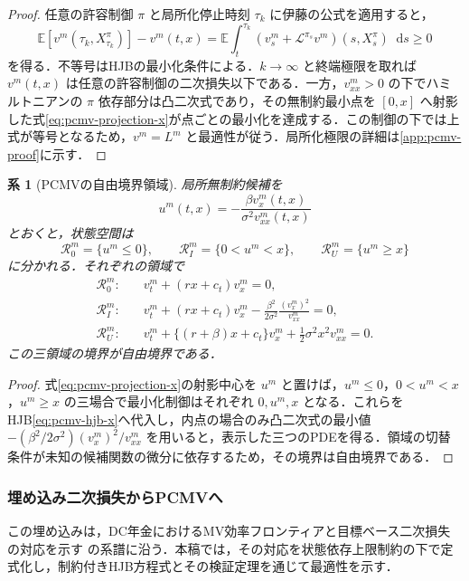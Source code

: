 \documentclass[10pt,a4paper]{article}
\theoremstyle{plain}
\newtheorem{corollary}{系}
\theoremstyle{definition}
\newcommand{\E}{\mathbb{E}}
\newcommand{\Lop}{\mathcal{L}}
\newcommand{\dd}{\mathop{}\!\mathrm{d}}
\begin{document}
\begin{proof}
任意の許容制御 $\pi$ と局所化停止時刻 $\tau_k$ に伊藤の公式を適用すると，
\[
 \E[v^m(\tau_k,X_{\tau_k}^{\pi})]-v^m(t,x)
 =\E\!\int_t^{\tau_k}(v_s^m+\Lop^{\pi_s}v^m)(s,X_s^{\pi})\dd s\geq0
\]
を得る．不等号はHJBの最小化条件による．$k\to\infty$ と終端極限を取れば $v^m(t,x)$ は任意の許容制御の二次損失以下である．一方，$v_{xx}^m>0$ の下でハミルトニアンの $\pi$ 依存部分は凸二次式であり，その無制約最小点を $[0,x]$ へ射影した式\eqref{eq:pcmv-projection-x}が点ごとの最小化を達成する．この制御の下では上式が等号となるため，$v^m=L^m$ と最適性が従う．局所化極限の詳細は\ref{app:pcmv-proof}に示す．
\end{proof}


\begin{corollary}[PCMVの自由境界領域]
\label{cor:pcmv-regions}
局所無制約候補を
\[
  u^m(t,x)= -\frac{\beta v_x^m(t,x)}{\sigma^2v_{xx}^m(t,x)}
\]
とおくと，状態空間は
\[
 \mathcal R_0^m=\{u^m\leq0\},\qquad
 \mathcal R_I^m=\{0<u^m<x\},\qquad
 \mathcal R_U^m=\{u^m\geq x\}
\]
に分かれる．それぞれの領域で
\begin{align*}
 \mathcal R_0^m:&\quad v_t^m+(rx+c_t)v_x^m=0,\\
 \mathcal R_I^m:&\quad v_t^m+(rx+c_t)v_x^m
 -\frac{\beta^2}{2\sigma^2}\frac{(v_x^m)^2}{v_{xx}^m}=0,\\
 \mathcal R_U^m:&\quad v_t^m+\{(r+\beta)x+c_t\}v_x^m
 +\frac12\sigma^2x^2v_{xx}^m=0.
\end{align*}
この三領域の境界が自由境界である．
\end{corollary}

\begin{proof}
式\eqref{eq:pcmv-projection-x}の射影中心を $u^m$ と置けば，$u^m\leq0$，$0<u^m<x$，$u^m\geq x$ の三場合で最小化制御はそれぞれ $0,u^m,x$ となる．これらをHJB\eqref{eq:pcmv-hjb-x}へ代入し，内点の場合のみ凸二次式の最小値 $-(\beta^2/2\sigma^2)(v_x^m)^2/v_{xx}^m$ を用いると，表示した三つのPDEを得る．領域の切替条件が未知の候補関数の微分に依存するため，その境界は自由境界である．
\end{proof}

\subsubsection{埋め込み二次損失からPCMVへ}

この埋め込みは，DC年金におけるMV効率フロンティアと目標ベース二次損失の対応を示す \citet{HojgaardVigna2007,Vigna2014,MenoncinVigna2017} の系譜に沿う．本稿では，その対応を状態依存上限制約の下で定式化し，制約付きHJB方程式とその検証定理を通じて最適性を示す．
\end{document}
